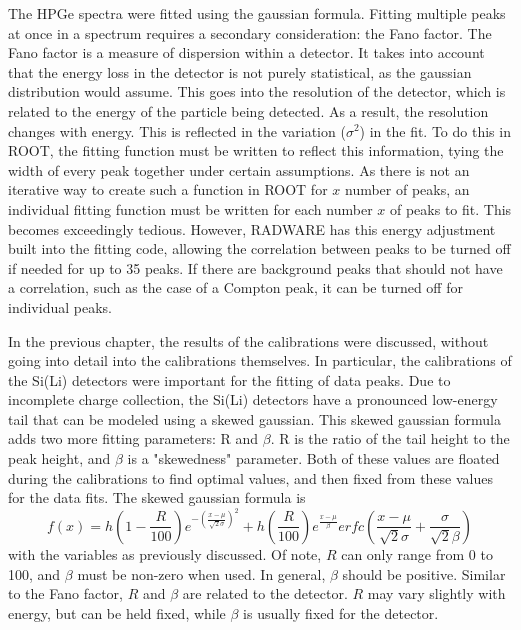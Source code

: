 The HPGe spectra were fitted using the gaussian formula. Fitting multiple peaks at once in a spectrum requires a secondary consideration: the Fano factor. The Fano factor is a measure of dispersion within a detector\citep{fano47:_factor}. It takes into account that the energy loss in the detector is not purely statistical, as the gaussian distribution would assume. This goes into the resolution of the detector, which is related to the energy of the particle being detected. As a result, the resolution changes with energy. This is reflected in the variation ($\sigma^2$) in the fit. To do this in ROOT, the fitting function must be written to reflect this information, tying the width of every peak together under certain assumptions. As there is not an iterative way to create such a function in ROOT for $x$ number of peaks, an individual fitting function must be written for each number $x$ of peaks to fit. This becomes exceedingly tedious. However, RADWARE has this energy adjustment built into the fitting code, allowing the correlation between peaks to be turned off if needed for up to 35 peaks. If there are background peaks that should not have a correlation, such as the case of a Compton peak, it can be turned off for individual peaks.

In the previous chapter, the results of the calibrations were discussed, without going into detail into the calibrations themselves. In particular, the calibrations of the Si(Li) detectors were important for the fitting of data peaks. Due to incomplete charge collection, the Si(Li) detectors have a pronounced low-energy tail that can be modeled using a skewed gaussian. This skewed gaussian formula adds two more fitting parameters: R and $\beta$. R is the ratio of the tail height to the peak height, and $\beta$ is a "skewedness" parameter. Both of these values are floated during the calibrations to find optimal values, and then fixed from these values for the data fits. The skewed gaussian formula is
\begin{equation}
    f(x) = h\left(1-\frac{R}{100}\right)e^{-\left(\frac{x-\mu}{\sqrt{2}\sigma}\right)^2} + h\left(\frac{R}{100}\right)e^{\frac{x-\mu}{\beta}}erfc\left(\frac{x-\mu}{\sqrt{2}\sigma}+\frac{\sigma}{\sqrt{2}\beta}\right)
    \label{eq:skew}
\end{equation}
with the variables as previously discussed. Of note, $R$ can only range from 0 to 100, and $\beta$ must be non-zero when used. In general, $\beta$ should be positive. Similar to the Fano factor, $R$ and $\beta$ are related to the detector. $R$ may vary slightly with energy, but can be held fixed, while $\beta$ is usually fixed for the detector.

